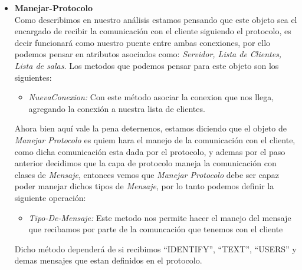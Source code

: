 \documentclass[10pt,letterpaper]{report}
\begin{document}
\begin{itemize}
             \begin{itemize}
                \item[-] {\textit{AgregarUsuario:}} Con este método podremos agregar un usuario al cuarto.
                \item[-] {\textit{EliminarUsuario:}} Con este método podremos eliminar un usuario del cuarto.
                \item[-] {\textit{Invitar:}} Con este método podremos mandar una invitación a un usuario.
                \item[-] {\textit{EliminarInvitado:}} Con este método podremos eliminar invitado de la lista de invitados (esto nos sirve pues si el usuario acepta la invitación pasa a la lista de usuarios, y deja la lista de invitados)
                 \item[-] {\textit{Vacio:}} Con este método podremos determinar si un cuarto se encuentra vacio, este nos servirá en particular pues el protocolo nos dice que un cuarto vacio debe ser eliminado, asi que saber si esta o no vacio es de gran utilidad.
                
            \end{itemize}
            
        \item[-] \textbf{Manejar-Protocolo}\\
        \noindent Como describimos en nuestro análisis estamos pensando que este objeto sea el encargado de recibir la comunicación con el cliente siguiendo el protocolo, es decir funcionará como nuestro puente entre ambas conexiones, por ello podemos pensar en atributos asociados como: \textit{Servidor, Lista de Clientes, Lista de salas.}
        Los metodos que podemos pensar para este objeto son los siguientes:
            \begin{itemize}
                \item[-] {\textit{NuevaConexion:}} Con este método asociar la conexion que nos llega, agregando la conexión a nuestra lista de clientes.
            \end{itemize}
        \noindent Ahora bien aquí vale la pena deternenos, estamos diciendo que el objeto de \textit{Manejar Protocolo} es quiem hara el manejo de la comunicación con el cliente, como dicha comunicación esta dada por el protocolo, y ademas por el paso anterior decidimos que la capa de protocolo maneja la comunicación con clases de \textit{Mensaje}, entonces vemos que \textit{Manejar Protocolo} debe ser capaz poder manejar dichos tipos de \textit{Mensaje}, por lo tanto podemos definir la siguiente operación:
            \begin{itemize}
                \item[-] {\textit{Tipo-De-Mensaje:}} Este metodo nos permite hacer el manejo del mensaje que recibamos por parte de la comuncación que tenemos con el cliente
            \end{itemize}
        Dicho método dependerá de si recibimos ``IDENTIFY'', ``TEXT'', ``USERS'' y demas mensajes que estan definidos en el protocolo.
        
    \end{itemize}
\end{document}
